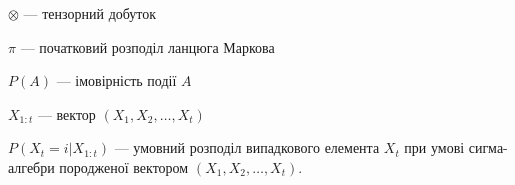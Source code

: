 $\otimes$ --- тензорний добуток

$\pi$ --- початковий розподіл ланцюга Маркова

$P(A)$ --- імовірність події $A$

$X_{1:t}$ --- вектор $(X_1, X_2, \dots, X_t)$

$P(X_t = i | X_{1:t})$ --- умовний розподіл випадкового елемента $X_t$ при умові сигма-алгебри породженої
вектором $(X_1, X_2, \dots, X_t)$.
